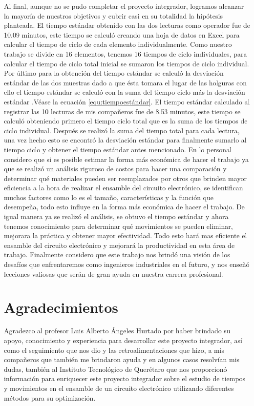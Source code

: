     Al final, aunque no se pudo completar el proyecto integrador, logramos alcanzar la mayoría de nuestros objetivos y cubrir casi en su totalidad la hipótesis planteada. El tiempo estándar obtenido con las dos lecturas como operador fue de 10.09 minutos, este tiempo se calculó creando una hoja de datos en Excel para calcular el tiempo de ciclo de cada elemento individualmente. Como nuestro trabajo se divide en 16 elementos, tenemos 16 tiempos de ciclo individuales, para calcular el tiempo de ciclo total inicial se sumaron los tiempos de ciclo individual. Por último para la
    obtención del tiempo estándar se calculó la desviación estándar de las dos muestras dado a que ésta tomara el lugar de las holguras con ello el tiempo estándar se calculó con la suma del tiempo ciclo más la desviación estándar .Véase la ecuación \ref{equ:tiempoestándar}.
    El tiempo estándar calculado al registrar las 10 lecturas de mis compañeros fue de 8.53 minutos, este tiempo se calculó obteniendo primero el tiempo ciclo total que es la suma de los tiempos de ciclo individual. Después se realizó la suma del tiempo total para cada lectura, una vez hecho esto se encontró la desviación estándar para finalmente sumarlo al tiempo ciclo y obtener el tiempo estándar antes mencionado.
    En lo personal considero que si es posible estimar la forma más económica de hacer el trabajo ya que se realizó un análisis riguroso de costos para hacer una comparación y determinar qué materiales pueden ser reemplazados por otros que brinden mayor eficiencia a la hora de realizar el ensamble del circuito electrónico, se identifican muchos factores como lo es el tamaño, características y la función que desempeña, todo esto influye en la forma más económica de hacer el trabajo. De igual manera ya se realizó el análisis, se obtuvo el tiempo estándar y ahora tenemos conocimiento para determinar qué movimientos se pueden eliminar, mejorara la práctica y obtener mayor efectividad. Todo esto hará mas eficiente el ensamble del circuito electrónico y mejorará la productividad en esta área de trabajo.  
    Finalmente considero que este trabajo nos brindó una visión de los desafíos que enfrentaremos como ingenieros industriales en el futuro, y nos enseñó lecciones valiosas que serán de gran ayuda en nuestra carrera profesional.
    
    \section{Agradecimientos}
    
    Agradezco al profesor Luis Alberto Ángeles Hurtado por haber brindado su apoyo, conocimiento y experiencia para desarrollar este proyecto integrador, así como el seguimiento que nos dio y las retroalimentaciones que hizo, a mis compañeros que también me brindaron ayuda y en algunos casos resolvían mis dudas, también al Instituto Tecnológico de Querétaro que nos proporcionó información para enriquecer este proyecto integrador sobre el estudio de tiempos y movimientos en el ensamble de un circuito electrónico utilizando diferentes métodos para su optimización. 
    
